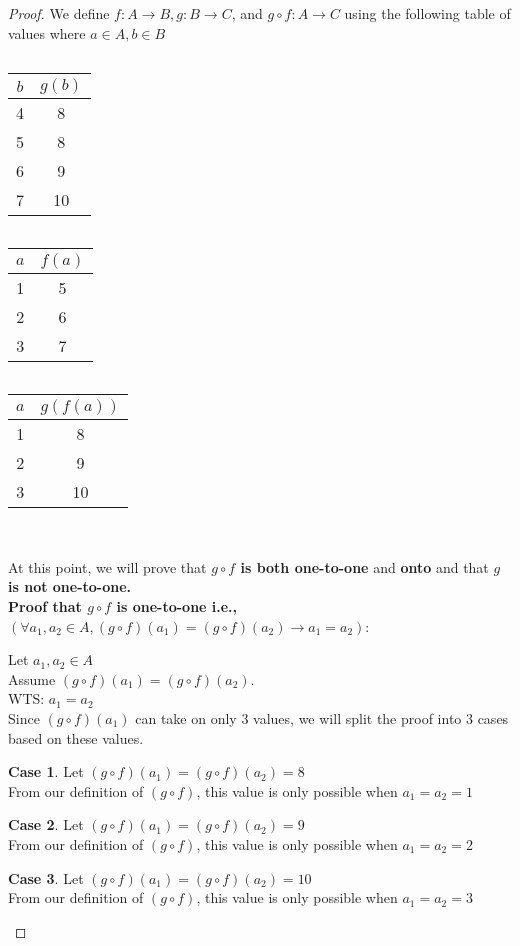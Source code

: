 \documentclass[12pt]{article}
\theoremstyle{definition}
\newtheorem{case}{Case}
\begin{document}
\begin{enumerate}
\begin{enumerate}[i]
\begin{proof}
We define $f: A \rightarrow B, g: B \rightarrow C$, and $g \circ f: A \rightarrow C$ using the following table of values where $a \in A, b \in B$
\begin{center}
    $\quad$\begin{tabular}{|c|c|}
\hline$b$ & $g(b)$ \\
\hline 4 & 8 \\
\hline 5 & 8 \\
\hline 6 & 9 \\
\hline 7 & 10 \\
\hline
\end{tabular} $\quad$\begin{tabular}{|c|c|}
\hline$a$ & $f(a)$ \\
\hline 1 & 5 \\
\hline 2 & 6 \\
\hline 3 & 7 \\
\hline
\end{tabular}$\quad$\begin{tabular}{|c|c|}
\hline$a$ & $g(f(a))$ \\
\hline 1 & 8 \\
\hline 2 & 9 \\
\hline 3 & 10 \\
\hline
\end{tabular} \\ 
\end{center}
At this point, we will prove that \textbf{$g \circ f$ is both one-to-one} and \textbf{onto} and that \textbf{$g$ is not one-to-one.}
\\
\textbf{Proof that $g \circ f$ is one-to-one i.e.,} $\left(\forall a_{1}, a_{2} \in A,(g \circ f)\left(a_{1}\right)=(g \circ f)\left(a_{2}\right) \rightarrow a_{1}=a_{2}\right)$:  

Let $a_{1}, a_{2} \in A$ \\
Assume $(g \circ f)\left(a_{1}\right)=(g \circ f)\left(a_{2}\right)$. \\
WTS: $a_1 = a_2$ \\
Since $(g \circ f)\left(a_{1}\right)$ can take on only 3 values, we will split the proof into 3 cases based on these values.
\setcounter{case}{0}
\begin{case}
Let $(g \circ f)\left(a_{1}\right)=(g \circ f)\left(a_{2}\right)=8$ \\ 
From our definition of $(g \circ f)$, this value is only possible when $a_{1}=a_{2}=1$
\end{case}
\begin{case}
Let $(g \circ f)\left(a_{1}\right)=(g \circ f)\left(a_{2}\right)=9$ \\ 
From our definition of $(g \circ f)$, this value is only possible when $a_{1}=a_{2}=2$
\end{case}
\begin{case}
Let $(g \circ f)\left(a_{1}\right)=(g \circ f)\left(a_{2}\right)=10$ \\ 
From our definition of $(g \circ f)$, this value is only possible when $a_{1}=a_{2}=3$
\end{case}


\end{proof}
\end{enumerate}
\end{enumerate}
\end{document}

